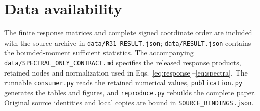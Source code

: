 \documentclass[aps,prd,onecolumn,11pt,nofootinbib,notitlepage]{revtex4-2}
\begin{document}
\section*{Data availability}
The finite response matrices and complete signed coordinate order are included with the source archive in \texttt{data/R31\_RESULT.json}; \texttt{data/RESULT.json} contains the bounded-moment sufficient statistics. The accompanying \texttt{data/SPECTRAL\_ONLY\_CONTRACT.md} specifies the released response products, retained nodes and normalization used in Eqs.~\eqref{eq:response}--\eqref{eq:spectra}. The runnable \texttt{consumer.py} reads the retained numerical values, \texttt{publication.py} generates the tables and figures, and \texttt{reproduce.py} rebuilds the complete paper. Original source identities and local copies are bound in \texttt{SOURCE\_BINDINGS.json}.



\end{document}
